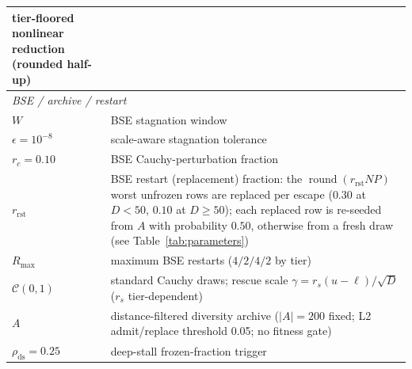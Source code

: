 \begin{table}[t]
\begin{tabular}{@{}l@{\hspace{1.2em}}p{}@{}}
  tier-floored nonlinear reduction (rounded half-up)\\
\midrule
\multicolumn{2}{l}{\emph{BSE / archive / restart}}\\
\midrule
$W$ & BSE stagnation window\\
$\epsilon=10^{-8}$ & scale-aware stagnation tolerance\\
$r_{c}=0.10$ & BSE Cauchy-perturbation fraction\\
$r_{\text{rst}}$ & BSE restart (replacement) fraction: the $\operatorname{round}(r_{\text{rst}}NP)$ worst unfrozen rows are replaced per escape ($0.30$ at $D{<}50$, $0.10$ at $D{\ge}50$); each replaced row is re-seeded from $A$ with probability $0.50$, otherwise from a fresh draw (see Table~\ref{tab:parameters})\\
$R_{\max}$ & maximum BSE restarts ($4/2/4/2$ by tier)\\
$\mathcal{C}(0,1)$ & standard Cauchy draws; rescue scale $\gamma=r_s(u{-}\ell)/\sqrt{D}$ ($r_s$ tier-dependent)\\
$A$ & distance-filtered diversity archive ($|A| = 200$ fixed; L2 admit/replace threshold 0.05; no fitness gate)\\
$\rho_{\text{ds}}=0.25$ & deep-stall frozen-fraction trigger\\
\bottomrule
\end{tabular}
\end{table}
